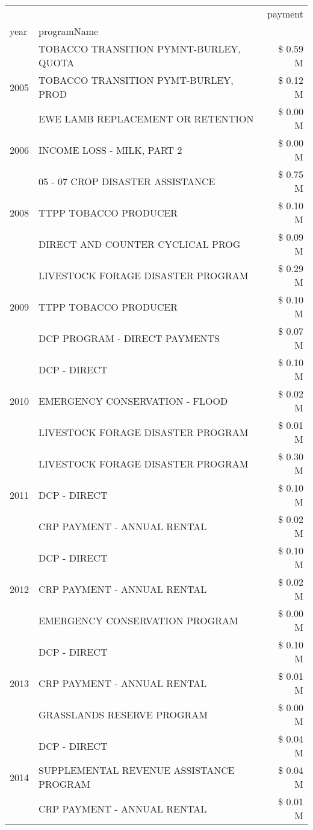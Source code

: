 \begin{tabular}{llr}
\toprule
 &  & payment \\
year & programName &  \\
\midrule
\multirow[t]{3}{*}{2005} & TOBACCO TRANSITION PYMNT-BURLEY, QUOTA & \$ 0.59 M \\
 & TOBACCO TRANSITION PYMT-BURLEY, PROD & \$ 0.12 M \\
 & EWE LAMB REPLACEMENT OR RETENTION & \$ 0.00 M \\
\cline{1-3}
2006 & INCOME LOSS - MILK, PART 2 & \$ 0.00 M \\
\cline{1-3}
\multirow[t]{3}{*}{2008} & 05 - 07 CROP DISASTER ASSISTANCE & \$ 0.75 M \\
 & TTPP TOBACCO PRODUCER & \$ 0.10 M \\
 & DIRECT AND COUNTER CYCLICAL PROG & \$ 0.09 M \\
\cline{1-3}
\multirow[t]{3}{*}{2009} & LIVESTOCK FORAGE DISASTER  PROGRAM & \$ 0.29 M \\
 & TTPP TOBACCO PRODUCER & \$ 0.10 M \\
 & DCP PROGRAM - DIRECT PAYMENTS & \$ 0.07 M \\
\cline{1-3}
\multirow[t]{3}{*}{2010} & DCP - DIRECT & \$ 0.10 M \\
 & EMERGENCY CONSERVATION - FLOOD & \$ 0.02 M \\
 & LIVESTOCK FORAGE DISASTER PROGRAM & \$ 0.01 M \\
\cline{1-3}
\multirow[t]{3}{*}{2011} & LIVESTOCK FORAGE DISASTER PROGRAM & \$ 0.30 M \\
 & DCP - DIRECT & \$ 0.10 M \\
 & CRP PAYMENT - ANNUAL RENTAL & \$ 0.02 M \\
\cline{1-3}
\multirow[t]{3}{*}{2012} & DCP - DIRECT & \$ 0.10 M \\
 & CRP PAYMENT - ANNUAL RENTAL & \$ 0.02 M \\
 & EMERGENCY CONSERVATION PROGRAM & \$ 0.00 M \\
\cline{1-3}
\multirow[t]{3}{*}{2013} & DCP - DIRECT & \$ 0.10 M \\
 & CRP PAYMENT - ANNUAL RENTAL & \$ 0.01 M \\
 & GRASSLANDS RESERVE PROGRAM & \$ 0.00 M \\
\cline{1-3}
\multirow[t]{3}{*}{2014} & DCP - DIRECT & \$ 0.04 M \\
 & SUPPLEMENTAL REVENUE ASSISTANCE PROGRAM & \$ 0.04 M \\
 & CRP PAYMENT - ANNUAL RENTAL & \$ 0.01 M \\

\end{tabular}
